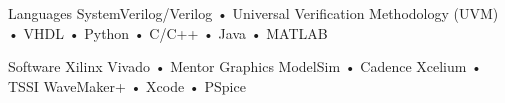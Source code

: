 


\begin{cvskills}


\cvskill
{Languages} %
{SystemVerilog/Verilog • Universal Verification Methodology (UVM) • VHDL • Python • C/C++ • Java • MATLAB} %


\cvskill
{Software} %
{ Xilinx Vivado • Mentor Graphics ModelSim • Cadence Xcelium • TSSI WaveMaker+ • Xcode • PSpice} %



\end{cvskills}
